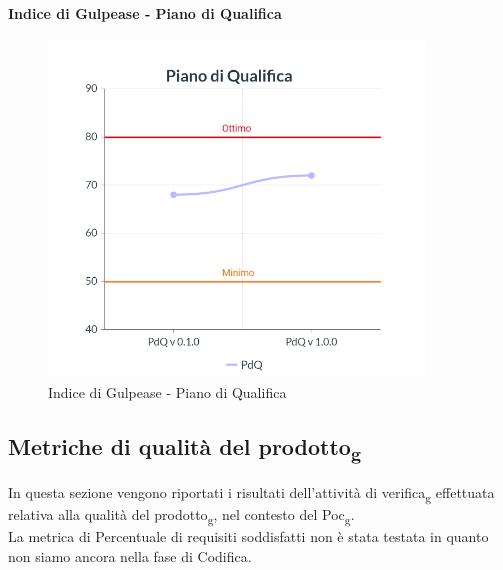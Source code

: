 \paragraph{Indice di Gulpease - Piano di Qualifica}
\begin{center}
\begin{figure}[H]
  \centering
  \renewcommand{\thefigure}{11}
  \includegraphics[width=10cm]{./res/images/PdQGraph.png}
  \caption{Indice di Gulpease - Piano di Qualifica}
  \label{fig:Indice di Gulpease - Piano di Qualifica}
\end{figure}
\end{center}

\subsection{Metriche di qualità del prodotto\textsubscript{g}}
In questa sezione vengono riportati i risultati dell'attività di verifica\textsubscript{g} effettuata relativa alla qualità del prodotto\textsubscript{g}, nel contesto del Poc\textsubscript{g}.\\
La metrica di Percentuale di requisiti soddisfatti non è stata testata in quanto non siamo ancora nella fase di Codifica.

